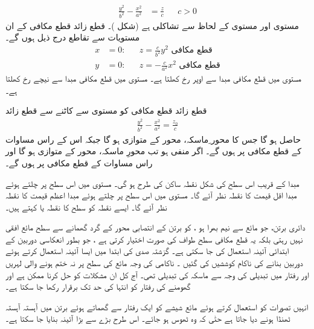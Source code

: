 \begin{align}\label{مساوات_سمتیہ_قطع_زائد_قطع_مکافی_الف}
\frac{y^2}{b^2}-\frac{x^2}{a^2}&=\frac{z}{c}&& c>0
\end{align}
مستوی  اور مستوی  کے لحاظ سے تشاکلی ہے (شکل )۔ قطع زائد قطع مکافی کے  ان مستویات  سے  تقاطع درج ذیل ہوں گے۔
\begin{align}
x&=0:&&z=\frac{c}{b^2}y^2\,\,\text{قطع مکافی}\label{مساوات_سمتیہ_قطع_زائد_قطع_مکافی_ب}\\
y&=0:&&z=-\frac{c}{a^2}x^2\,\,\text{قطع مکافی}\label{مساوات_سمتیہ_قطع_زائد_قطع_مکافی_پ}
\end{align}
مستوی   میں  قطع مکافی مبدا سے اوپر رخ  کھلتا ہے۔  مستوی  میں قطع مکافی مبدا سے نیچے رخ کھلتا ہے۔

قطع زائد قطع مکافی کو مستوی    سے   کاٹنے سے قطع زائد
\begin{align*}
\frac{y^2}{b^2}-\frac{x^2}{a^2}=\frac{z_0}{c}
\end{align*}
حاصل ہو گا جس کا محور ِماسکہ،   محور  کے متوازی ہو گا  جبکہ اس کے راس  مساوات  کے  قطع مکافی پر ہوں  گے۔ اگر  منفی ہو تب محورِ ماسکہ،   محور  کے متوازی ہو گا اور راس مساوات  کے  قطع مکافی پر ہوں گے۔

مبدا کے قریب اس سطح کی شکل  نقطہ ساکن      کی طرح ہو گی۔ مستوی  میں اس سطح پر چلتے ہوئے مبدا اقل   قیمت کا نقطہ نظر  آئے گا۔ مستوی  میں اس  سطح پر چلتے ہوئے  مبدا اعظم قیمت کا نقطہ نظر آئے گا۔  ایسے نقطہ کو   سطح کا  نقطہ یا کہتے ہیں۔

دائری برتن،   جو مائع  سے نیم بھرا ہو ، کو  برتن کے  انتصابی   محور کے گرد گھمانے  سے سطح مائع افقی نہیں رہتی بلکہ یہ قطع مکافی سطح طواف   کی صورت اختیار کرتی ہے ، جو   بطور انعکاسی دوربین  کے ابتدائی آئینہ استعمال کی جا سکتی ہے۔   گزشتہ صدی کی ابتدا میں  ایسا آئینہ استعمال کرتے ہوئے دوربین بنانے کی ناکام  کوششیں کی گئیں ۔ ناکامی کی وجہ  مائع کی سطح پر  نہ ختم ہونے والی لہریں  اور رفتار میں تبدیلی کی وجہ سے ماسکہ کی تبدیلی تھی۔ آج کل ان مشکلات کو حل کرنا ممکن ہے اور گھومنے کی رفتار کو انتہا کی حد تک برقرار رکھا جا سکتا ہے۔

انہیں تصورات کو استعمال کرتے ہوئے  مائع شیشے   کو ایک رفتار سے  گھماتے ہوئے  برتن میں آہستہ آہستہ ٹھنڈا ہونے دیا جاتا ہے حتٰی کہ وہ ٹھوس ہو جائے۔ اس طرح بڑے سے بڑا آئینہ بنایا جا سکتا ہے۔


